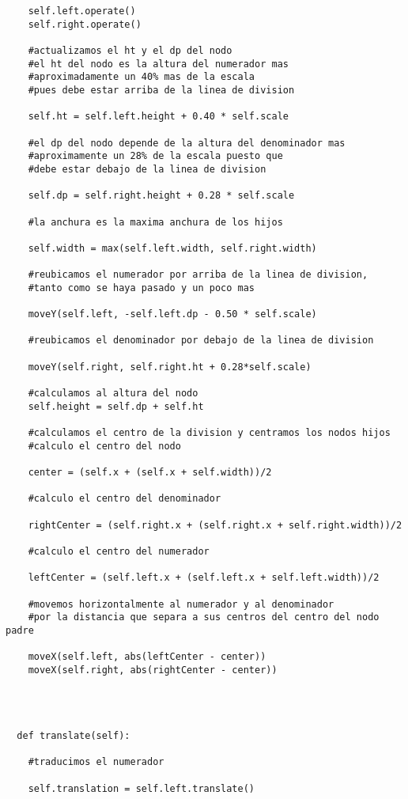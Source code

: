 \begin{verbatim}
    self.left.operate()
    self.right.operate()
    
    #actualizamos el ht y el dp del nodo
    #el ht del nodo es la altura del numerador mas 
    #aproximadamente un 40% mas de la escala 
    #pues debe estar arriba de la linea de division

    self.ht = self.left.height + 0.40 * self.scale

    #el dp del nodo depende de la altura del denominador mas
    #aproximamente un 28% de la escala puesto que 
    #debe estar debajo de la linea de division

    self.dp = self.right.height + 0.28 * self.scale
    
    #la anchura es la maxima anchura de los hijos

    self.width = max(self.left.width, self.right.width)

    #reubicamos el numerador por arriba de la linea de division,
    #tanto como se haya pasado y un poco mas

    moveY(self.left, -self.left.dp - 0.50 * self.scale)
    
    #reubicamos el denominador por debajo de la linea de division

    moveY(self.right, self.right.ht + 0.28*self.scale)

    #calculamos al altura del nodo
    self.height = self.dp + self.ht

    #calculamos el centro de la division y centramos los nodos hijos
    #calculo el centro del nodo

    center = (self.x + (self.x + self.width))/2

    #calculo el centro del denominador

    rightCenter = (self.right.x + (self.right.x + self.right.width))/2

    #calculo el centro del numerador

    leftCenter = (self.left.x + (self.left.x + self.left.width))/2

    #movemos horizontalmente al numerador y al denominador
    #por la distancia que separa a sus centros del centro del nodo padre

    moveX(self.left, abs(leftCenter - center))
    moveX(self.right, abs(rightCenter - center))


      
    
  def translate(self):

    #traducimos el numerador

    self.translation = self.left.translate()


\end{verbatim}
